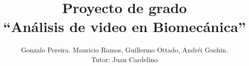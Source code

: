 \documentclass[11pt,a4paper,titlepage,spanish]{article}
\title{Proyecto de grado\\ ``Análisis de video en Biomecánica''}
\author{Gonzalo Pereira. Mauricio Ramos, Guillermo Ottado, Andréi Guchin. \\
Tutor: Juan Cardelino}
\date {}
\begin{document}
\maketitle

\newpage
\tableofcontents
\newpage


\clearpage
\vspace*{\fill}
\begin{center}
\begin{minipage}{.8\textwidth}

\end{minipage}
\end{center}
\vfill %



\clearpage

\clearpage

\clearpage

\clearpage

\clearpage

\clearpage

\clearpage

\clearpage

\clearpage

%
\clearpage

\clearpage

\clearpage

\clearpage

\clearpage


\nocite{*} %




%
%
\end{document}

